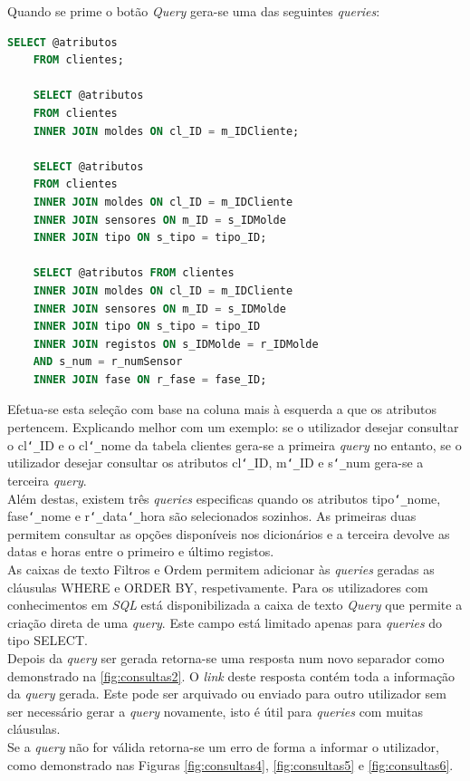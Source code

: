 \documentclass[11pt,twoside,a4paper]{report}
\begin{document}
\newpage
Quando  se prime o botão \textit{Query} gera-se uma das seguintes \textit{queries}:
\begin{lstlisting}[language = SQL]
	SELECT @atributos
	FROM clientes;
	
	SELECT @atributos
	FROM clientes
	INNER JOIN moldes ON cl_ID = m_IDCliente;
	
	SELECT @atributos
	FROM clientes
	INNER JOIN moldes ON cl_ID = m_IDCliente
	INNER JOIN sensores ON m_ID = s_IDMolde
	INNER JOIN tipo ON s_tipo = tipo_ID;
	
	SELECT @atributos FROM clientes
	INNER JOIN moldes ON cl_ID = m_IDCliente
	INNER JOIN sensores ON m_ID = s_IDMolde 
	INNER JOIN tipo ON s_tipo = tipo_ID
	INNER JOIN registos ON s_IDMolde = r_IDMolde
	AND s_num = r_numSensor
	INNER JOIN fase ON r_fase = fase_ID;
\end{lstlisting}
Efetua-se esta seleção com base na coluna mais à esquerda a que os atributos pertencem. Explicando melhor com um exemplo: se o utilizador desejar consultar o cl\texttt{\char`_}ID e o cl\texttt{\char`_}nome da tabela clientes gera-se a primeira \textit{query} no entanto, se o utilizador desejar consultar os atributos cl\texttt{\char`_}ID, m\texttt{\char`_}ID e s\texttt{\char`_}num gera-se a terceira \textit{query}.\\
Além destas, existem três \textit{queries} especificas quando os atributos tipo\texttt{\char`_}nome, fase\texttt{\char`_}nome e r\texttt{\char`_}data\texttt{\char`_}hora são selecionados sozinhos. As primeiras duas permitem consultar as opções disponíveis nos dicionários e a terceira devolve as datas e horas entre o primeiro e último registos.\\
As caixas de texto Filtros e Ordem permitem adicionar às \textit{queries} geradas as cláusulas WHERE e ORDER BY, respetivamente. Para os utilizadores com conhecimentos em \textit{SQL} está disponibilizada a caixa de texto \textit{Query} que permite a criação direta de uma \textit{query}. Este campo está limitado apenas para \textit{queries} do tipo SELECT.\\
Depois da \textit{query} ser gerada retorna-se uma resposta num novo separador como demonstrado na \autoref{fig:consultas2}. O \textit{link} deste resposta contém toda a informação da \textit{query} gerada. Este pode ser arquivado ou enviado para outro utilizador sem ser necessário gerar a \textit{query} novamente, isto é útil para \textit{queries} com muitas cláusulas.\\
Se a \textit{query} não for válida retorna-se um erro de forma a informar o utilizador, como demonstrado nas Figuras \ref{fig:consultas4}, \ref{fig:consultas5} e \ref{fig:consultas6}.
\end{document}
